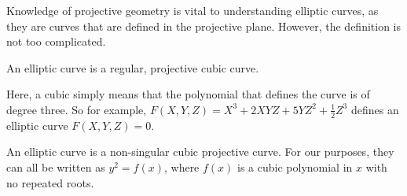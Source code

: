 Knowledge of projective geometry is vital to understanding elliptic curves, as they are curves that are defined in the projective plane.
However, the definition is not too complicated.
\begin{definition}
	An elliptic curve is a regular, projective cubic curve.
\end{definition}
Here, a cubic simply means that the polynomial that defines the curve is of degree three. So for example, $F(X,Y,Z) = X^3 + 2XYZ + 5YZ^2 + \frac{1}{2}Z^3$ defines an elliptic curve $F(X,Y,Z) = 0$. %
\begin{definition}
	An elliptic curve is a non-singular cubic projective curve. For our purposes, they can all be written as $y^2 = f(x)$, where $f(x)$ is a cubic polynomial in $x$ with no repeated roots.
\end{definition}
